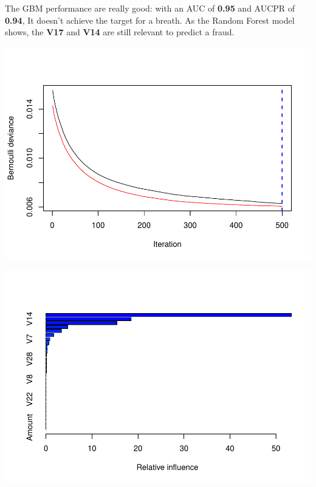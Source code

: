 \documentclass[]{article}
\begin{document}
The GBM performance are really good: with an AUC of \textbf{0.95} and
AUCPR of \textbf{0.94}, It doesn't achieve the target for a breath. As
the Random Forest model shows, the \textbf{V17} and \textbf{V14} are
still relevant to predict a fraud.

\begin{center}\includegraphics{Credit_Card_Fraud_Detection_Project_Report_files/figure-latex/unnamed-chunk-21-1} \end{center}

\begin{center}\includegraphics{Credit_Card_Fraud_Detection_Project_Report_files/figure-latex/unnamed-chunk-21-2} \end{center}
\end{document}
